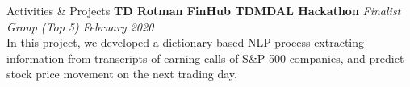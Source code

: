 \documentclass{resume} %
\begin{document}
\begin{rSection}{Activities \& Projects}
{\bf TD Rotman FinHub TDMDAL Hackathon} \emph{Finalist Group (Top 5)} \hfill \emph{February 2020}
\\ In this project, we developed a dictionary based NLP process extracting information from transcripts of earning calls of S\&P 500 companies, and predict stock price movement on the next trading day.

\end{rSection}
\end{document}
